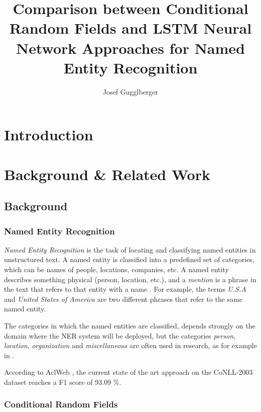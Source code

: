 \documentclass[12pt]{book}
\begin{document}
    \title{Comparison between Conditional Random Fields and LSTM Neural Network Approaches for Named Entity Recognition}
    \author{Josef Gugglberger}
 
    \beforepreface

 	\afterpreface
 	
 	
    \chapter{Introduction}
   
	\chapter{Background \& Related Work}
	
	\section{Background}
	
	\subsection{Named Entity Recognition}
	
	\textit{Named Entity Recognition} is the task of locating and classifying named entities in unstructured text. A named entity is classified into a predefined set of categories, which can be names of people, locations, companies, etc. A named entity describes something physical (person, location, etc.), and a \textit{mention} is a phrase in the text that refers to that entity with a name \cite{MAL-013}. For example, the terms \textit{U.S.A} and \textit{United States of America} are two different phrases that refer to the same named entity.
	
	The categories in which the named entities are classified, depends strongly on the domain where the NER system will be deployed, but the categories \textit{person}, \textit{location}, \textit{organization} and \textit{miscellaneous} are often used in research, as for example in \cite{tjongkimsang2003conll}.
	 
	According to AclWeb \cite{conll-sota}, the current state of the art approach on the CoNLL-2003 \cite{tjongkimsang2003conll} dataset reaches a F1 score of 93.09 \%.
	
	\subsection{Conditional Random Fields}
	
\end{document}
